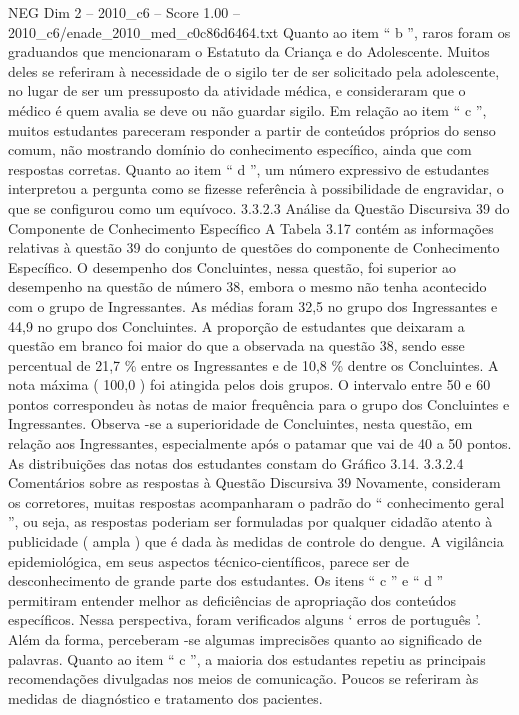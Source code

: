 \begin{textsample}{NEG Dim 2 – 2010\_c6 – Score 1.00 – 2010\_c6/enade\_2010\_med\_c0c86d6464.txt}
Quanto ao item “ b ”, raros foram os graduandos que mencionaram o Estatuto da Criança e do Adolescente.
Muitos deles se referiram à necessidade de o sigilo ter de ser solicitado pela adolescente, no lugar de ser um pressuposto da atividade médica, e consideraram que o médico é quem avalia se deve ou não guardar sigilo.
Em relação ao item “ c ”, muitos estudantes pareceram responder a partir de conteúdos próprios do senso comum, não mostrando domínio do conhecimento específico, ainda que com respostas corretas.
Quanto ao item “ d ”, um número expressivo de estudantes interpretou a pergunta como se fizesse referência à possibilidade de engravidar, o que se configurou como um equívoco. 3.3.2.3 Análise da Questão Discursiva 39 do Componente de Conhecimento Específico A Tabela 3.17 contém as informações relativas à questão 39 do conjunto de questões do componente de Conhecimento Específico.
O desempenho dos Concluintes, nessa questão, foi superior ao desempenho na questão de número 38, embora o mesmo não tenha acontecido com o grupo de Ingressantes.
As médias foram 32,5 no grupo dos Ingressantes e 44,9 no grupo dos Concluintes.
A proporção de estudantes que deixaram a questão em branco foi maior do que a observada na questão 38, sendo esse percentual de 21,7 \% entre os Ingressantes e de 10,8 \% dentre os Concluintes.
A nota máxima ( 100,0 ) foi atingida pelos dois grupos.
O intervalo entre 50 e 60 pontos correspondeu às notas de maior frequência para o grupo dos Concluintes e Ingressantes.
Observa -se a superioridade de Concluintes, nesta questão, em relação aos Ingressantes, especialmente após o patamar que vai de 40 a 50 pontos.
As distribuições das notas dos estudantes constam do Gráfico 3.14. 3.3.2.4 Comentários sobre as respostas à Questão Discursiva 39 Novamente, consideram os corretores, muitas respostas acompanharam o padrão do “ conhecimento geral ”, ou seja, as respostas poderiam ser formuladas por qualquer cidadão atento à publicidade ( ampla ) que é dada às medidas de controle do dengue.
A vigilância epidemiológica, em seus aspectos técnico-científicos, parece ser de desconhecimento de grande parte dos estudantes.
Os itens “ c ” e “ d ” permitiram entender melhor as deficiências de apropriação dos conteúdos específicos.
Nessa perspectiva, foram verificados alguns ‘ erros de português ’.
Além da forma, perceberam -se algumas imprecisões quanto ao significado de palavras.
Quanto ao item “ c ”, a maioria dos estudantes repetiu as principais recomendações divulgadas nos meios de comunicação.
Poucos se referiram às medidas de diagnóstico e tratamento dos pacientes.

\end{textsample}
